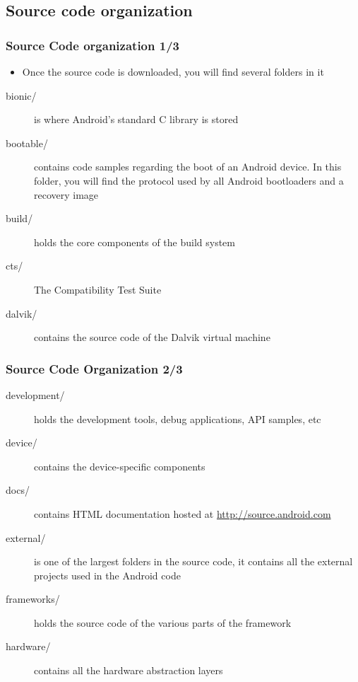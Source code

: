\subsection{Source code organization}
\begin{frame}
  \frametitle{Source Code organization 1/3}
  \begin{itemize}
  \item Once the source code is downloaded, you will find several
    folders in it
  \end{itemize}
  \begin{description}
  \item[bionic/] is where Android's standard C library is stored
  \item[bootable/] contains code samples regarding the boot of an
    Android device. In this folder, you will find the protocol used by
    all Android bootloaders and a recovery image
  \item[build/] holds the core components of the build system
  \item[cts/] The Compatibility Test Suite
  \item[dalvik/] contains the source code of the Dalvik virtual
    machine
  \end{description}
\end{frame}

\begin{frame}
  \frametitle{Source Code Organization 2/3}
  \begin{description}
  \item[development/] holds the development tools, debug applications,
    API samples, etc
  \item[device/] contains the device-specific components
  \item[docs/] contains HTML documentation hosted at
    \url{http://source.android.com}
  \item[external/] is one of the largest folders in the source code, it
    contains all the external projects used in the Android code
  \item[frameworks/] holds the source code of the various parts of the
    framework
  \item[hardware/] contains all the hardware abstraction layers
  \end{description}
\end{frame}


